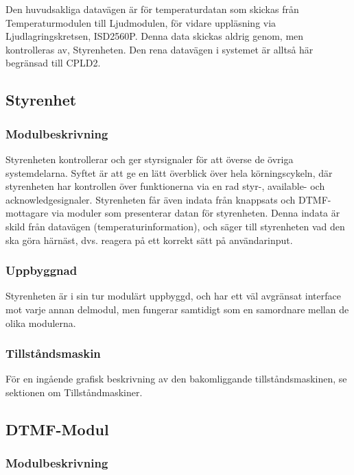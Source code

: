 \documentclass[a4paper,11pt]{article}
\begin{document}
	Den huvudsakliga datavägen är för temperaturdatan som skickas från Temperaturmodulen till Ljudmodulen,
	för vidare uppläsning via Ljudlagringskretsen, ISD2560P. Denna data skickas aldrig genom, men kontrolleras av,
	Styrenheten. Den rena datavägen i systemet är alltså här begränsad till CPLD2.

	\subsection{Styrenhet}

	\subsubsection{Modulbeskrivning}

	Styrenheten kontrollerar och ger styrsignaler för att överse de övriga systemdelarna. Syftet är att ge en
	lätt överblick över hela körningscykeln, där styrenheten har kontrollen över funktionerna via en rad styr-,
	available- och acknowledgesignaler. Styrenheten får även indata från knappsats och DTMF-mottagare via moduler
	som presenterar datan för styrenheten. Denna indata är skild från datavägen (temperaturinformation), och säger
	till styrenheten vad den ska göra härnäst, dvs. reagera på ett korrekt sätt på användarinput.

	\subsubsection{Uppbyggnad}

	Styrenheten är i sin tur modulärt uppbyggd, och har ett väl avgränsat interface mot varje annan delmodul, men
	fungerar samtidigt som en samordnare mellan de olika modulerna.

	\subsubsection{Tillståndsmaskin}

	För en ingående grafisk beskrivning av den bakomliggande tillståndsmaskinen, se sektionen om Tillståndmaskiner.

	\subsection{DTMF-Modul}
		
	\subsubsection{Modulbeskrivning}
\end{document}
